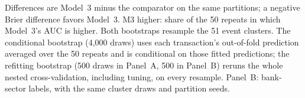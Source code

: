 \begin{table}[!t]
\begin{tabular*}{\textwidth}{@{\extracolsep{\fill}}lccccc}
\bottomrule
\end{tabular*}
\par\vspace{2pt}\parbox{0.96\textwidth}{\scriptsize Differences are Model~3 minus the comparator on the same partitions; a negative Brier
difference favors Model~3. M3 higher: share of the 50 repeats in which Model~3's AUC is higher. Both bootstraps resample the 51 event
clusters. The conditional bootstrap (4,000 draws) uses each transaction's out-of-fold prediction averaged over the 50 repeats and
is conditional on those fitted predictions; the refitting bootstrap (500 draws in Panel~A, 500 in Panel~B) reruns the
whole nested cross-validation, including tuning, on every resample. Panel~B: bank-sector labels, with the same cluster draws and
partition seeds.}
\end{table}

